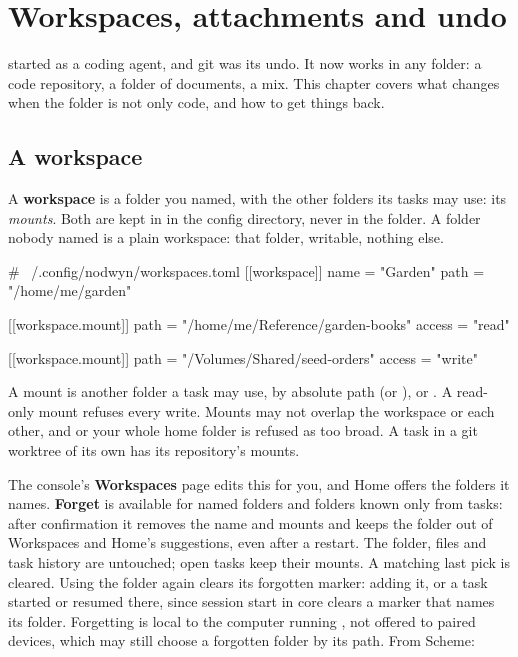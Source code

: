 \chapter{Workspaces, attachments and undo}
\label{ch:workspaces}

\nodwyn{} started as a coding agent, and git was its undo. It now works in
any folder: a code repository, a folder of documents, a mix. This chapter
covers what changes when the folder is not only code, and how to get
things back.

\section{A workspace}

A \textbf{workspace} is a folder you named, with the other folders its
tasks may use: its \emph{mounts}. Both are kept in 
in the config directory, never in the folder. A folder nobody named is a
plain workspace: that folder, writable, nothing else.

\begin{toml}
# ~/.config/nodwyn/workspaces.toml
[[workspace]]
name = "Garden"
path = "/home/me/garden"

[[workspace.mount]]
path = "/home/me/Reference/garden-books"
access = "read"

[[workspace.mount]]
path = "/Volumes/Shared/seed-orders"
access = "write"
\end{toml}

A mount is another folder a task may use, by absolute path (or
\code{\textasciitilde/}),  or . A read-only mount
refuses every write. Mounts may not overlap the workspace or each other, and
\code{/} or your whole home folder is refused as too broad. A task in a
git worktree of its own has its repository's mounts.

The console's \textbf{Workspaces} page edits this for you, and Home offers
the folders it names. \textbf{Forget} is available for named folders and
folders known only from tasks: after confirmation it removes the name and
mounts and keeps the folder out of Workspaces and Home's suggestions, even
after a restart. The folder, files and task history are untouched; open
tasks keep their mounts. A matching last pick is cleared. Using the folder
again clears its forgotten marker: adding it, or a task started or resumed
there, since session start in core clears a marker that names its folder.
Forgetting is local to the computer running \nodwyn{}, not offered to paired
devices, which may still choose a forgotten folder by its path. From Scheme:

